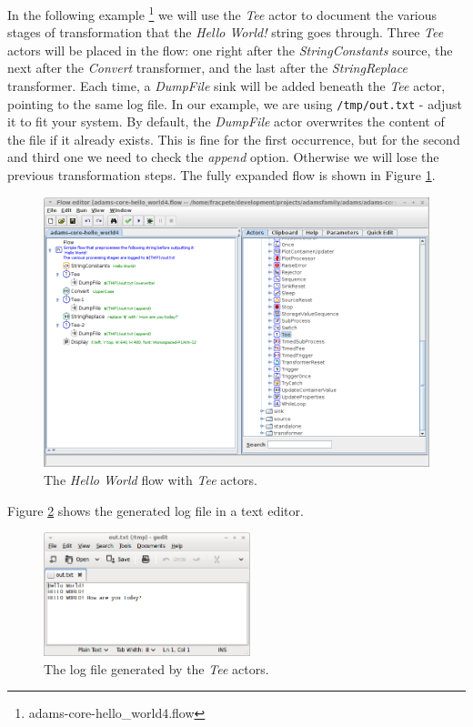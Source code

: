 In the following example \footnote{adams-core-hello\_world4.flow} we will use
the \textit{Tee} actor to document the various stages of transformation that the \textit{Hello World!} string goes
through. Three \textit{Tee} actors will be placed in the flow: one right after
the \textit{StringConstants} source, the next after the \textit{Convert}
transformer, and the last after the \textit{StringReplace} transformer.
Each time, a \textit{DumpFile} sink will be added beneath the \textit{Tee}
actor, pointing to the same log file. In our example, we are using
\texttt{/tmp/out.txt} - adjust it to fit your system. By default, the
\textit{DumpFile} actor overwrites the content of the file if it already exists.
This is fine for the first occurrence, but for the second and third one we need
to check the \textit{append} option. Otherwise we will lose the previous
transformation steps. The fully expanded flow is shown in Figure
\ref{floweditor-helloworld-tee_flow}.
\begin{figure}[htb]
  \centering
  \includegraphics[width=12.0cm]{images/floweditor-helloworld-tee_flow.png}
  \caption{The \textit{Hello World} flow with \textit{Tee} actors.}
  \label{floweditor-helloworld-tee_flow}
\end{figure}
Figure \ref{floweditor-helloworld-tee_logfile} shows the generated log file in a
text editor.
\begin{figure}[htb]
  \centering
  \includegraphics[width=6.0cm]{images/floweditor-helloworld-tee_logfile.png}
  \caption{The log file generated by the \textit{Tee} actors.}
  \label{floweditor-helloworld-tee_logfile}
\end{figure}


